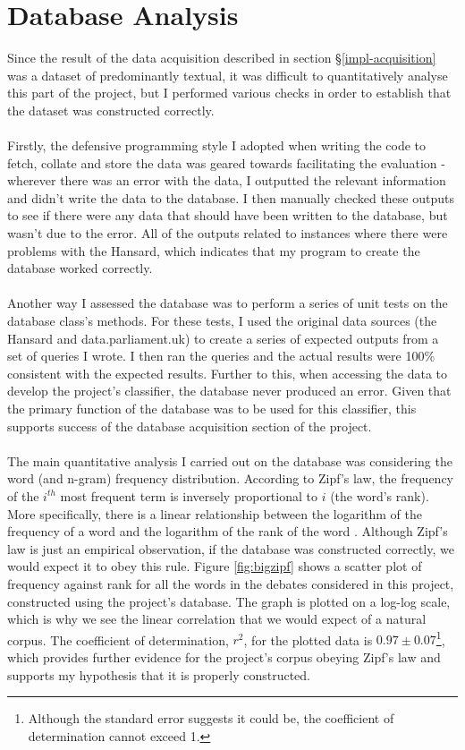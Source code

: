 \documentclass[12pt,a4paper,twoside,openright]{report}
\begin{document}
\section{Database Analysis} \label{eval-database}

Since the result of the data acquisition described in section \S\ref{impl-acquisition} was a dataset of predominantly textual, it was difficult to quantitatively analyse this part of the project, but I performed various checks in order to establish that the dataset was constructed correctly.
\\\\
Firstly, the defensive programming style I adopted when writing the code to fetch, collate and store the data was geared towards facilitating the evaluation - wherever there was an error with the data, I outputted the relevant information and didn't write the data to the database. I then manually checked these outputs to see if there were any data that should have been written to the database, but wasn't due to the error. All of the outputs related to instances where there were problems with the Hansard, which indicates that my program to create the database worked correctly.
\\\\
Another way I assessed the database was to perform a series of unit tests on the database class's methods. For these tests, I used the original data sources (the Hansard and data.parliament.uk) to create a series of expected outputs from a set of queries I wrote. I then ran the queries and the actual results were 100\% consistent with the expected results. Further to this, when accessing the data to develop the project's classifier, the database never produced an error. Given that the primary function of the database was to be used for this classifier, this supports success of the database acquisition section of the project.
\\\\
The main quantitative analysis I carried out on the database was considering the word (and n-gram) frequency distribution. According to Zipf's law, the frequency of the $i^{th}$ most frequent term is inversely proportional to $i$ (the word's rank). More specifically, there is a linear relationship between the logarithm of the frequency of a word and the logarithm of the rank of the word \cite{zipf}. Although Zipf's law is just an empirical observation, if the database was constructed correctly, we would expect it to obey this rule. Figure \ref{fig:bigzipf} shows a scatter plot of frequency against rank for all the words in the debates considered in this project, constructed using the project's database. The graph is plotted on a log-log scale, which is why we see the linear correlation that we would expect of a natural corpus. The coefficient of determination, $r^2$, for the plotted data is $0.97 \pm 0.07$\footnote{Although the standard error suggests it could be, the coefficient of determination cannot exceed 1.}, which provides further evidence for the project's corpus obeying Zipf's law and supports my hypothesis that it is properly constructed. 
\end{document}
